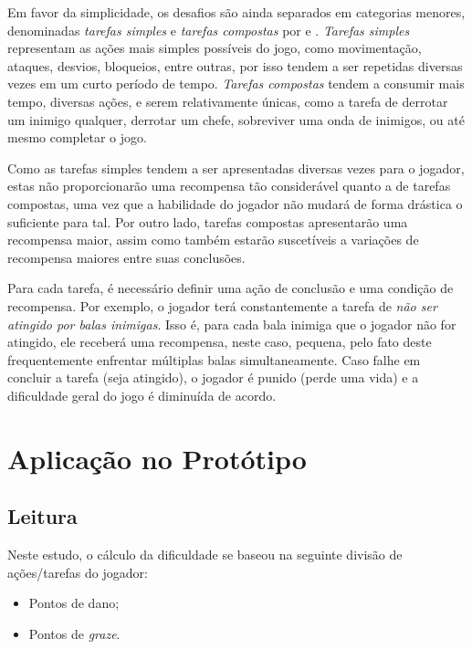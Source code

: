Em favor da simplicidade, os desafios são ainda separados em categorias menores, denominadas \textit{tarefas simples} e \textit{tarefas compostas} por \citet{ExperimentalValidation} e \citet{FearOfFailing}. \textit{Tarefas simples} representam as ações mais simples possíveis do jogo, como movimentação, ataques, desvios, bloqueios, entre outras, por isso tendem a ser repetidas diversas vezes em um curto período de tempo. \textit{Tarefas compostas} tendem a consumir mais tempo, diversas ações, e serem relativamente únicas, como a tarefa de derrotar um inimigo qualquer, derrotar um chefe, sobreviver uma onda de inimigos, ou até mesmo completar o jogo.

Como as tarefas simples tendem a ser apresentadas diversas vezes para o jogador, estas não proporcionarão uma recompensa tão considerável quanto a de tarefas compostas, uma vez que a habilidade do jogador não mudará de forma drástica o suficiente para tal. Por outro lado, tarefas compostas apresentarão uma recompensa maior, assim como também estarão suscetíveis a variações de recompensa maiores entre suas conclusões.

Para cada tarefa, é necessário definir uma ação de conclusão e uma condição de recompensa. Por exemplo, o jogador terá constantemente a tarefa de \textit{não ser atingido por balas inimigas}. Isso é, para cada bala inimiga que o jogador não for atingido, ele receberá uma recompensa, neste caso, pequena, pelo fato deste frequentemente enfrentar múltiplas balas simultaneamente. Caso falhe em concluir a tarefa (seja atingido), o jogador é punido (perde uma vida) e a dificuldade geral do jogo é diminuída de acordo.

\section{Aplicação no Protótipo}

\subsection{Leitura}

Neste estudo, o cálculo da dificuldade se baseou na seguinte divisão de ações/tarefas do jogador:

\begin{itemize}
    \item Pontos de dano;
    \item Pontos de \textit{graze}.
\end{itemize}

